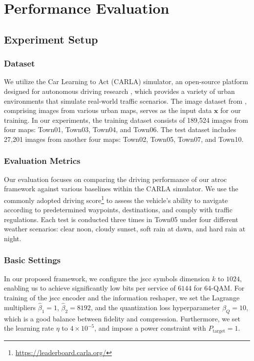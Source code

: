 \section{Performance Evaluation}
\label{sec:result}
\subsection{Experiment Setup}
\subsubsection{Dataset}
We utilize the Car Learning to Act (CARLA) simulator, an open-source platform designed for autonomous driving research \cite{Dosovitskiy_2017_CAO}, which provides a variety of urban environments that simulate real-world traffic scenarios. The image dataset from \cite{Wu_2022_TgC}, comprising images from various urban maps, serves as the input data \(\bm{x}\) for our training. In our experiments, the training dataset consists of 189,524 images from four maps: Town01, Town03, Town04, and Town06. The test dataset includes 27,201 images from another four maps: Town02, Town05, Town07, and Town10.

\subsubsection{Evaluation Metrics}
Our evaluation focuses on comparing the driving performance of our \gls{atroc} framework against various baselines within the CARLA simulator. We use the commonly adopted driving score\footnote{\url{https://leaderboard.carla.org/}} to assess the vehicle's ability to navigate according to predetermined waypoints, destinations, and comply with traffic regulations. Each test is conducted three times in Town05 under four different weather scenarios: clear noon, cloudy sunset, soft rain at dawn, and hard rain at night.


\subsubsection{Basic Settings}
In our proposed framework, we configure the \gls{jscc} symbols dimension $k$ to $1024$, enabling us to achieve significantly low bits per service of $6144$ for 64-QAM. For training of the \gls{jscc} encoder and the information reshaper, we set the Lagrange multipliers $\hat{\beta}_1 = 1$, $\hat{\beta}_2 = 8192$, and the quantization loss hyperparameter $\beta_{Q}=10$, which is a good balance between fidelity and compression. Furthermore, we set the learning rate \(\eta\) to \(4\times10^{-5}\), and impose a power constraint with $P_{\text{target}} = 1$. 

